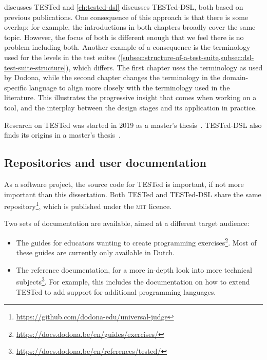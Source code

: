\documentclass[../main]{subfiles}
\begin{document}
 discusses TESTed and \cref{ch:tested-dsl} discusses TESTed-DSL, both based on previous publications.
One consequence of this approach is that there is some overlap: for example, the introductions in both chapters broadly cover the same topic.
However, the focus of both is different enough that we feel there is no problem including both.
Another example of a consequence is the terminology used for the levels in the test suites (\cref{subsec:structure-of-a-test-suite,subsec:dsl-test-suite-structure}), which differs.
The first chapter uses the terminology as used by Dodona, while the second chapter changes the terminology in the domain-specific language to align more closely with the terminology used in the literature.
This illustrates the progressive insight that comes when working on a tool, and the interplay between the design stages and its application in practice.

Research on TESTed was started in 2019 as a master's thesis~\autocite{strijbolTESTedOneJudge2020}.
TESTed-DSL also finds its origins in a master's thesis~\autocite{selsTESTedProgrammeertaalonafhankelijkTesten2021}.

\subsection{Repositories and user documentation}\label{subsec:repositories-and-code}

As a software project, the source code for TESTed is important, if not more important than this dissertation.
Both TESTed and TESTed-DSL share the same repository\footnote{\url{https://github.com/dodona-edu/universal-judge}}, which is published under the \textsc{mit} licence.

Two sets of documentation are available, aimed at a different target audience:

\begin{itemize}
    \item The guides for educators wanting to create programming exercises\footnote{\url{https://docs.dodona.be/en/guides/exercises/}}.
    Most of these guides are currently only available in Dutch.
    \item The reference documentation, for a more in-depth look into more technical subjects\footnote{\url{https://docs.dodona.be/en/references/tested/}}.
    For example, this includes the documentation on how to extend TESTed to add support for additional programming languages.
\end{itemize}
\end{document}
